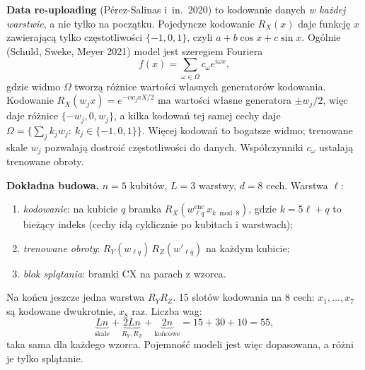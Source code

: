 \documentclass[11pt,a4paper]{article}
\begin{document}
\textbf{Data re-uploading} (Pérez-Salinas i~in.\ 2020) to kodowanie danych \emph{w każdej warstwie},
a nie tylko na początku. Pojedyncze kodowanie $R_X(x)$ daje funkcję $x$ zawierającą tylko
częstotliwości $\{-1,0,1\}$, czyli $a+b\cos x+c\sin x$. Ogólnie (Schuld, Sweke, Meyer 2021)
model jest szeregiem Fouriera
\[
  f(x)=\sum_{\omega\in\Omega}c_\omega e^{i\omega x},
\]
gdzie widmo $\Omega$ tworzą różnice wartości własnych generatorów kodowania. Kodowanie
$R_X(w_jx)=e^{-iw_jxX/2}$ ma wartości własne generatora $\pm w_j/2$, więc daje różnice
$\{-w_j,0,w_j\}$, a kilka kodowań tej samej cechy daje
$\Omega=\{\sum_jk_jw_j:\ k_j\in\{-1,0,1\}\}$. Więcej kodowań to bogatsze widmo; trenowane skale
$w_j$ pozwalają dostroić częstotliwości do danych. Współczynniki $c_\omega$ ustalają trenowane
obroty.

\textbf{Dokładna budowa.} $n=5$ kubitów, $L=3$ warstwy, $d=8$ cech. Warstwa $\ell$:
\begin{enumerate}
  \item \emph{kodowanie}: na kubicie $q$ bramka $R_X(w^{\text{enc}}_{\ell q}\,x_{k\bmod 8})$, gdzie
  $k=5\ell+q$ to bieżący indeks (cechy idą cyklicznie po kubitach i warstwach);
  \item \emph{trenowane obroty}: $R_Y(w_{\ell q})\,R_Z(w'_{\ell q})$ na każdym kubicie;
  \item \emph{blok splątania}: bramki CX na parach z wzorca.
\end{enumerate}
Na końcu jeszcze jedna warstwa $R_YR_Z$. 15 slotów kodowania na 8 cech: $x_1,\dots,x_7$ są
kodowane dwukrotnie, $x_8$ raz. Liczba wag:
\[
  \underbrace{Ln}_{\text{skale}}+\underbrace{2Ln}_{R_Y,R_Z}+\underbrace{2n}_{\text{końcowe}}=15+30+10=55,
\]
taka sama dla każdego wzorca. Pojemność modeli jest więc dopasowana, a różni je tylko splątanie.

\begin{center}
\end{center}
\end{document}
